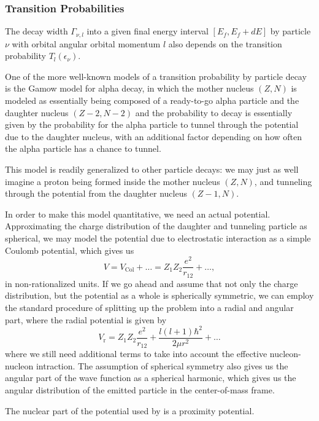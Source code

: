 \clearpage
\subsubsection{Transition Probabilities}
The decay width $\Gamma_{\nu,l}$ into a given final energy interval $[E_f,E_f+dE]$ by particle $\nu$ with orbital angular orbital momentum $l$ also depends on the transition probability $T_l(\epsilon_\nu)$.

One of the more well-known models of a transition probability by particle decay is the Gamow model for alpha decay, in which the mother nucleus $(Z,N)$ is modeled as essentially being composed of a ready-to-go alpha particle and the daughter nucleus $(Z-2,N-2)$ and the probability to decay is essentially given by the probability for the alpha particle to tunnel through the potential due to the daughter nucleus, with an additional factor depending on how often the alpha particle has a chance to tunnel. 

This model is readily generalized to other particle decays: we may just as well imagine a proton being formed inside the mother nucleus $(Z,N)$, and tunneling through the potential from the daughter nucleus $(Z-1,N)$.

In order to make this model quantitative, we need an actual potential. Approximating the charge distribution of the daughter and tunneling particle as spherical, we may model the potential due to electrostatic interaction as a simple Coulomb potential, which gives us
\begin{equation}
V = V_\text{Col} + \dots =  Z_1 Z_2 \frac{e^2}{r_{12}} + \dots,
\end{equation}
in non-rationalized units.
If we go ahead and assume that not only the charge distribution, but the potential as a whole is spherically symmetric, we can employ the standard procedure of splitting up the problem into a radial and angular part, where the radial potential is given by
\begin{equation}
V_\text{r} = Z_1 Z_2 \frac{e^2}{r_{12}} + \frac{l(l+1)\hbar^2}{2\mu r^2} + \dots
\end{equation}
where we still need additional terms to take into account the effective nucleon-nucleon intraction. The assumption of spherical symmetry also gives us the angular part of the wave function as a spherical harmonic, which gives us the angular distribution of the emitted particle in the center-of-mass frame.

The nuclear part of the potential used by  is a proximity potential\cite{gollerthan:1988:thesis}\cite{blocki1977}. 

